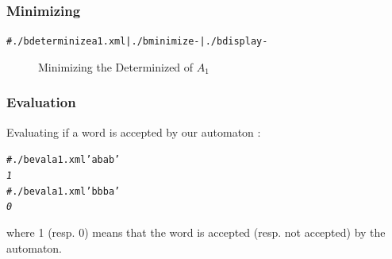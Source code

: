 \subsubsection{Minimizing}

\begin{alltt}
# ./b determinize a1.xml | ./b minimize - | ./b display -
\end{alltt}

\begin{figure}[!ht]
  \centering
  \caption{Minimizing the Determinized of $A_1$}
\end{figure}

\subsubsection{Evaluation}

Evaluating if a word is accepted by our automaton :
\begin{alltt}
# ./b eval a1.xml 'abab'
\textit{1}
# ./b eval a1.xml 'bbba'
\textit{0}
\end{alltt}
where 1 (resp. 0) means that the word is accepted (resp. not accepted)
by the automaton.


